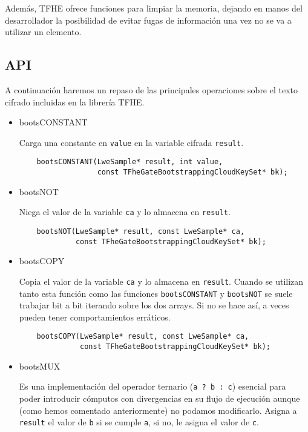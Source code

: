Además, TFHE ofrece funciones para limpiar la memoria, dejando en manos del desarrollador la posibilidad de evitar fugas de información una vez no se va a utilizar un elemento.

\subsection{API}

A continuación haremos un repaso de las principales operaciones sobre el texto cifrado incluidas en la librería TFHE.

\begin{itemize}

  \item bootsCONSTANT

  Carga una constante en \verb|value| en la variable cifrada \verb|result|.

  \begin{verbatim}
    bootsCONSTANT(LweSample* result, int value,
                  const TFheGateBootstrappingCloudKeySet* bk);
  \end{verbatim}

  \item bootsNOT

  Niega el valor de la variable \verb|ca| y lo almacena en \verb|result|.

  \begin{verbatim}
    bootsNOT(LweSample* result, const LweSample* ca,
             const TFheGateBootstrappingCloudKeySet* bk);
  \end{verbatim}

  \item bootsCOPY

  Copia el valor de la variable \verb|ca| y lo almacena en \verb|result|. Cuando se utilizan tanto esta función como las funciones \verb|bootsCONSTANT|  y \verb|bootsNOT| se suele trabajar bit a bit iterando sobre los dos arrays. Si no se hace así, a veces pueden tener comportamientos erráticos.

  \begin{verbatim}
    bootsCOPY(LweSample* result, const LweSample* ca,
              const TFheGateBootstrappingCloudKeySet* bk);
  \end{verbatim}

  \item bootsMUX

  Es una implementación del operador ternario (\verb|a ? b : c|) esencial para poder introducir cómputos con divergencias en su flujo de ejecución aunque (como hemos comentado anteriormente) no podamos modificarlo. Asigna a \verb|result| el valor de \verb|b| si se cumple \verb|a|, si no, le asigna el valor de \verb|c|.


\end{itemize}
